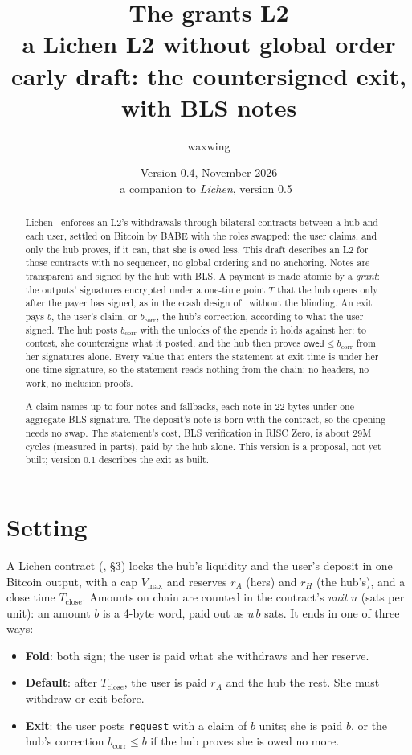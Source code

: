 \documentclass[11pt]{article}
\title{\textbf{The grants L2}\\a Lichen L2 without global order\\[2pt]\large early draft: the countersigned exit, with BLS notes}
\author{waxwing}
\date{Version 0.4, November 2026\\[2pt]\small a companion to \emph{Lichen}, version 0.5~\cite{lichen}}
\theoremstyle{plain}
\theoremstyle{definition}
\newcommand{\vmax}{V_{\max}}
\newcommand{\Tc}{T_{\mathrm{close}}}
\newcommand{\bcorr}{b_{\mathrm{corr}}}
\newcommand{\tx}[1]{\texttt{#1}}
\newcommand{\owed}{\mathsf{owed}}
\begin{document}
\maketitle

\begin{abstract}
Lichen~\cite{lichen} enforces an L2's withdrawals through bilateral
contracts between a hub and each user, settled on Bitcoin by BABE with
the roles swapped: the user claims, and only the hub proves, if it can,
that she is owed less. This draft describes an L2 for those contracts
with no sequencer, no global ordering and no anchoring. Notes are
transparent and signed by the hub with BLS. A payment is made atomic
by a \emph{grant}: the outputs' signatures encrypted under a one-time
point $T$ that the hub opens only after the payer has signed, as in
the ecash design of~\cite{ecash} without the blinding. An exit pays
$b$, the user's claim, or $\bcorr$, the hub's correction, according to
what the user signed. The hub posts $\bcorr$ with the unlocks of the
spends it holds against her; to contest, she countersigns what it
posted, and the hub then proves $\owed \le \bcorr$ from her signatures
alone. Every value that enters the statement at exit time is under her
one-time signature, so the statement reads nothing from the chain: no
headers, no work, no inclusion proofs.

A claim names up to four notes and fallbacks, each note in 22 bytes
under one aggregate BLS signature. The deposit's note is born with the
contract, so the opening needs no swap. The statement's cost, BLS
verification in RISC Zero, is about 29M cycles (measured in parts),
paid by the hub alone. This version is a proposal, not yet built;
version 0.1 describes the exit as built.
\end{abstract}

\tableofcontents

\section{Setting}

A Lichen contract (\cite{lichen}, \S3) locks the hub's liquidity and the
user's deposit in one Bitcoin output, with a cap $\vmax$ and reserves
$r_A$ (hers) and $r_H$ (the hub's), and a close time $\Tc$. Amounts on
chain are counted in the contract's \emph{unit} $u$ (sats per unit): an
amount $b$ is a 4-byte word, paid out as $u\,b$ sats. It ends in one of
three ways:
\begin{itemize}[nosep]
\item \textbf{Fold}: both sign; the user is paid what she withdraws and
  her reserve.
\item \textbf{Default}: after $\Tc$, the user is paid $r_A$ and the hub
  the rest. She must withdraw or exit before.
\item \textbf{Exit}: the user posts \tx{request} with a claim of $b$
  units; she is paid $b$, or the hub's correction $\bcorr \le b$ if the
  hub proves she is owed no more.
\end{itemize}
\end{document}
